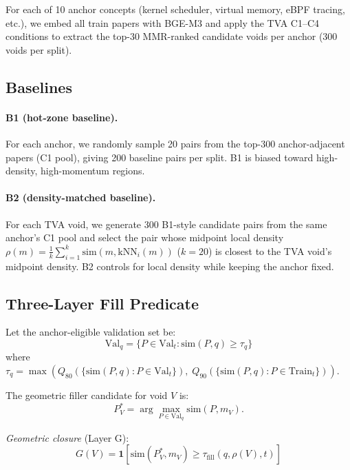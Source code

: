 \documentclass[sigconf]{acmart}
\newcommand{\tva}{\textsf{TVA}}
\newcommand{\valq}{\mathrm{Val}_{q}}
\newcommand{\taufill}{\tau_{\mathrm{fill}}}
\newcommand{\tauanchor}{\tau_{q}}
\begin{document}
For each of 10 anchor concepts (kernel scheduler, virtual memory, eBPF tracing, etc.),
we embed all train papers with BGE-M3 and apply the \tva{} C1--C4 conditions to
extract the top-30 MMR-ranked candidate voids per anchor (300 voids per split).

\subsection{Baselines}

\paragraph{B1 (hot-zone baseline).}
For each anchor, we randomly sample 20 pairs from the top-300 anchor-adjacent papers
(C1 pool), giving 200 baseline pairs per split.
B1 is biased toward high-density, high-momentum regions.

\paragraph{B2 (density-matched baseline).}
For each \tva{} void, we generate 300 B1-style candidate pairs from the same anchor's
C1 pool and select the pair whose midpoint local density
$\rho(m) = \frac{1}{k}\sum_{i=1}^{k}\mathrm{sim}(m, \mathrm{kNN}_i(m))$ ($k=20$)
is closest to the \tva{} void's midpoint density.
B2 controls for local density while keeping the anchor fixed.

\subsection{Three-Layer Fill Predicate}
\label{sec:predicate}

Let the anchor-eligible validation set be:
\begin{equation}
\valq = \{P \in \mathrm{Val}_t : \mathrm{sim}(P, q) \ge \tauanchor\}
\end{equation}
where $\tauanchor = \max(Q_{80}(\{\mathrm{sim}(P,q): P \in \mathrm{Val}_t\}),\;
Q_{90}(\{\mathrm{sim}(P,q): P \in \mathrm{Train}_t\}))$.

The geometric filler candidate for void $V$ is:
\begin{equation}
P_V^* = \arg\max_{P \in \valq} \mathrm{sim}(P, m_V).
\end{equation}

\emph{Geometric closure} (Layer G):
\begin{equation}
G(V) = \mathbf{1}[\mathrm{sim}(P_V^*, m_V) \ge \taufill(q, \rho(V), t)]
\end{equation}
\end{document}
